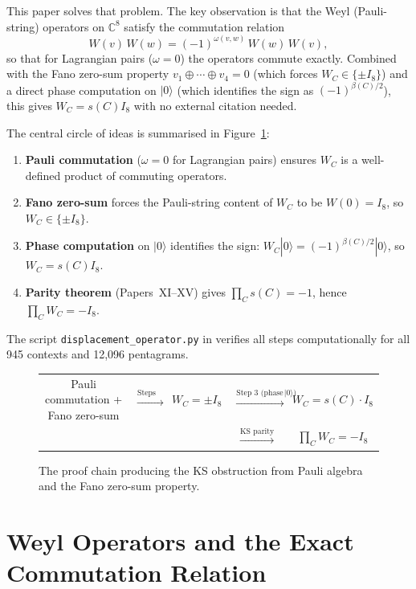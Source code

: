 \documentclass[11pt,a4paper]{article}
\theoremstyle{remark}
\begin{document}
This paper solves that problem.
The key observation is that the Weyl (Pauli-string) operators on $\mathbb{C}^8$
satisfy the commutation relation
\[
  W(v)\,W(w) = (-1)^{\omega(v,w)}\, W(w)\,W(v),
\]
so that for Lagrangian pairs ($\omega=0$) the operators commute exactly.
Combined with the Fano zero-sum property $v_1 \oplus \cdots \oplus v_4 = 0$
(which forces $W_C \in \{\pm I_8\}$) and a direct phase computation
on $|0\rangle$ (which identifies the sign as $(-1)^{\beta(C)/2}$),
this gives $W_C = s(C) I_8$ with no external citation needed.

The central circle of ideas is summarised in Figure~\ref{fig:circle}:

\begin{enumerate}
  \item \textbf{Pauli commutation} ($\omega=0$ for Lagrangian pairs)
        ensures $W_C$ is a well-defined product of commuting operators.
  \item \textbf{Fano zero-sum} forces the Pauli-string content of $W_C$
        to be $W(0) = I_8$, so $W_C \in \{\pm I_8\}$.
  \item \textbf{Phase computation} on $|0\rangle$ identifies the sign:
        $W_C|0\rangle = (-1)^{\beta(C)/2}|0\rangle$, so $W_C = s(C) I_8$.
  \item \textbf{Parity theorem} (Papers~XI--XV) gives
        $\prod_C s(C) = -1$, hence $\prod_C W_C = -I_8$.
\end{enumerate}

\noindent
The script \texttt{displacement\_operator.py} in \cite{PaperXVIsuppl}
verifies all steps computationally for all 945 contexts and 12{,}096
pentagrams.

\begin{figure}[H]
\centering
\begin{tabular}{ccccc}
Pauli commutation + Fano zero-sum
& $\xrightarrow{\text{Steps 1--2}}$
& $W_C = \pm I_8$
& $\xrightarrow{\text{Step 3 (phase on $|0\rangle$)}}$
& $W_C = s(C) \cdot I_8$ \\
& & & $\xrightarrow{\text{KS parity}}$
& $\displaystyle\prod_C W_C = -I_8$
\end{tabular}
\caption{The proof chain producing the KS obstruction
from Pauli algebra and the Fano zero-sum property.}
\label{fig:circle}
\end{figure}


\section{Weyl Operators and the Exact Commutation Relation}\label{sec:weyl}
\end{document}
